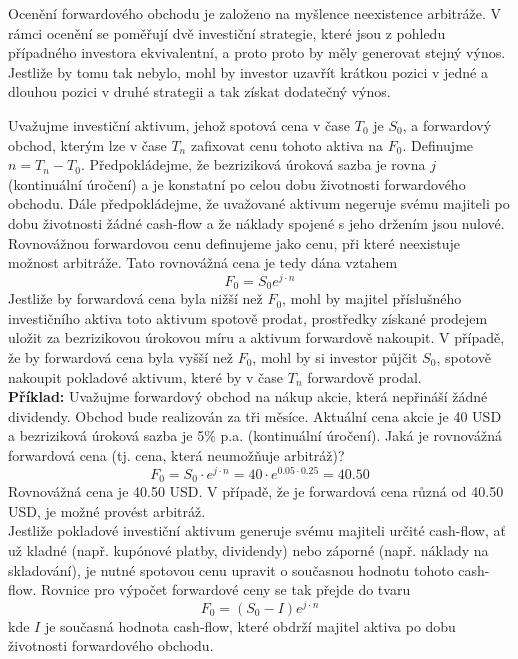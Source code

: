 \documentclass[a4paper]{book}
\begin{document}
Ocenění forwardového obchodu je založeno na myšlence neexistence arbitráže. V rámci ocenění se poměřují dvě investiční strategie, které jsou z pohledu případného investora ekvivalentní, a proto proto by měly generovat stejný výnos. Jestliže by tomu tak nebylo, mohl by investor uzavřít krátkou pozici v jedné a dlouhou pozici v druhé strategii a tak získat dodatečný výnos.

Uvažujme investiční aktivum, jehož spotová cena v čase $T_0$ je $S_0$, a forwardový obchod, kterým lze v čase $T_n$ zafixovat cenu tohoto aktiva na $F_0$. Definujme $n = T_n - T_0$. Předpokládejme, že bezriziková úroková sazba je rovna $j$ (kontinuální úročení) a je konstatní po celou dobu životnosti forwardového obchodu. Dále předpokládejme, že uvažované aktivum negeruje svému majiteli po dobu životnosti žádné cash-flow a že náklady spojené s jeho držením jsou nulové. Rovnovážnou forwardovou cenu definujeme jako cenu, při které neexistuje možnost arbitráže. Tato rovnovážná cena je tedy dána vztahem
\begin{equation*}
F_0 = S_0e^{j \cdot n}
\end{equation*}
Jestliže by forwardová cena byla nižší než $F_0$, mohl by majitel příslušného investičního aktiva toto aktivum spotově prodat, prostředky získané prodejem uložit za bezrizikovou úrokovou míru a aktivum forwardově nakoupit. V případě, že by forwardová cena byla vyšší než $F_0$, mohl by si investor půjčit $S_0$, spotově nakoupit pokladové aktivum, které by v čase $T_n$ forwardově prodal.\\

\noindent \textbf{Příklad:} Uvažujme forwardový obchod na nákup akcie, která nepřináší žádné dividendy. Obchod bude realizován za tři měsíce. Aktuální cena akcie je 40 USD a bezriziková úroková sazba je 5\% p.a. (kontinuální úročení). Jaká je rovnovážná forwardová cena (tj. cena, která neumožňuje arbitráž)?
\begin{equation*}
F_0 = S_0 \cdot e^{j \cdot n} = 40 \cdot e^{0.05 \cdot 0.25} = 40.50
\end{equation*}
Rovnovážná cena je 40.50 USD. V případě, že je forwardová cena různá od 40.50 USD, je možné provést arbitráž.\\

Jestliže pokladové investiční aktivum generuje svému majiteli určité cash-flow, ať už kladné (např. kupónové platby, dividendy) nebo záporné (např. náklady na skladování), je nutné spotovou cenu upravit o současnou hodnotu tohoto cash-flow. Rovnice pro výpočet forwardové ceny se tak přejde do tvaru
\begin{equation*}
F_0 = (S_0 - I)e^{j \cdot n}
\end{equation*}
kde $I$ je současná hodnota cash-flow, které obdrží majitel aktiva po dobu životnosti forwardového obchodu.\\
\end{document}
